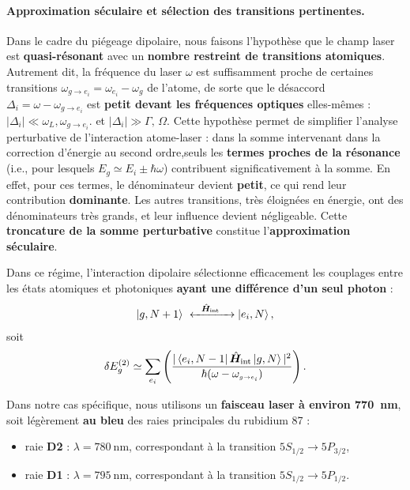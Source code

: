 \medskip

\paragraph{Approximation séculaire et sélection des transitions pertinentes.}

Dans le cadre du piégeage dipolaire, nous faisons l’hypothèse que le champ laser est \textbf{quasi-résonant} avec un \textbf{nombre restreint de transitions atomiques}. Autrement dit, la fréquence du laser \( \omega \) est suffisamment proche de certaines transitions \( \omega_{\scriptscriptstyle g \rightarrow e_i} = \omega_{e_i} - \omega_g  \) de l’atome, de sorte que le désaccord \( \Delta_i = \omega - \omega_{g \rightarrow e_i} \) est \textbf{petit devant les fréquences optiques} elles-mêmes :
\(
|\Delta_i| \ll \omega_L, \omega_{\scriptscriptstyle g \rightarrow e_i}.
\)
et 
\(
|\Delta_i|\gg \Gamma,\,\Omega .
\)
Cette hypothèse permet de simplifier l’analyse perturbative de l’interaction atome-laser : dans la somme intervenant dans la correction d’énergie au second ordre,seuls les \textbf{termes proches de la résonance} (i.e., pour lesquels \( E_g \simeq E_i \pm \hbar \omega \)) contribuent significativement à la somme. En effet, pour ces termes, le dénominateur devient \textbf{petit}, ce qui rend leur contribution \textbf{dominante}. Les autres transitions, très éloignées en énergie, ont des dénominateurs très grands, et leur influence devient négligeable. Cette \textbf{troncature de la somme perturbative} constitue l’\textbf{approximation séculaire}.

\medskip

Dans ce régime, l’interaction dipolaire sélectionne efficacement les couplages entre les états atomiques et photoniques \textbf{ayant une différence d’un seul photon} :
\begin{eqnarray*}
	\ket{g, N+1} \xleftrightarrow{\quad \operator{H}_{\text{int}}\quad} \ket{e_i, N},	
\end{eqnarray*}
soit 
\begin{eqnarray}
		\delta E_g^{(2)} 
		\simeq \sum_{e_i} \left (  
		\frac{|\bra{e_i, N-1} \hat{\bm{H}}_{\mathrm{int}} \ket{g, N}|^2}{\hbar ( \omega - \omega_{\scriptscriptstyle g \rightarrow e_i } )} 
		\right).
\end{eqnarray}

\medskip


Dans notre cas spécifique, nous utilisons un \textbf{faisceau laser à environ 770~nm}, soit légèrement \textbf{au bleu} des raies principales du rubidium 87 :
\begin{itemize}[label = $\bullet$]
  \item raie \textbf{D2} : \( \lambda = 780~\text{nm} \), correspondant à la transition \( 5S_{1/2} \rightarrow 5P_{3/2} \),
  \item raie \textbf{D1} : \( \lambda = 795~\text{nm} \), correspondant à la transition \( 5S_{1/2} \rightarrow 5P_{1/2} \).
\end{itemize}

